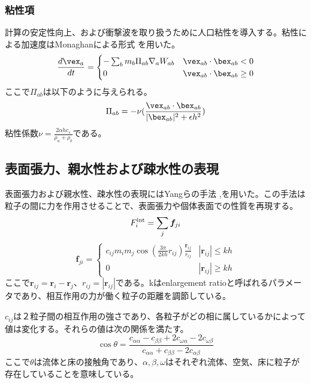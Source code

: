 \documentclass[]{jsarticle}
\begin{document}
\subsubsection{粘性項}
計算の安定性向上、および衝撃波を取り扱うために人口粘性を導入する。粘性による加速度はMonaghanによる形式 \cite{Monaghan2005}を用いた。
\begin{equation}
\frac{d\vex_a}{dt}=\begin{cases}
  -\sum_bm_b\Pi_{ab}\nabla_aW_{ab} & \vex_{ab}\cdot\bex_{ab}<0 \\
  0 & \vex_{ab}\cdot\bex_{ab}\geq0
\end{cases}
\end{equation}
ここで$\Pi_{ab}$は以下のように与えられる。
\begin{equation}
\Pi_{ab}=-\nu(\frac{\vex_{ab}\cdot\bex_{ab}}{|\bex_{ab}|^2+\epsilon h^2})
\end{equation}
粘性係数$\nu=\frac{2\alpha h c_s}{\rho_a+\rho_b}$である。

\subsection{表面張力、親水性および疎水性の表現}
表面張力および親水性、疎水性の表現にはYangらの手法 \cite{Yang2016},\cite{Yang2017}を用いた。この手法は粒子の間に力を作用させることで、表面張力や個体表面での性質を再現する。
\begin{equation}
F^{\rm{int}}_i=\sum_{j} \bm{f}_{ji}
\end{equation}
\begin{equation}
  \bm{f}_{ji}=\begin{cases}
    c_{ij}m_im_j\cos(\frac{3\pi}{2kh}r_{ij})\frac{\bm{r}_{ij}}{r_{ij}} & \text{$|\bm{r}_{ij}|\leq kh$}\\
    0 & \text{$|\bm{r}_{ij}|\geq kh$}
\end{cases}
\end{equation}
ここで$\bm{r}_{ij}=\bm{r}_i-\bm{r}_{j}$、$r_{ij}=|\bm{r}_{ij}|$である。kはenlargement ratioと呼ばれるパラメータであり、相互作用の力が働く粒子の距離を調節している。

$c_{ij}$は２粒子間の相互作用の強さであり、各粒子がどの相に属しているかによって値は変化する。それらの値は次の関係を満たす。
\begin{equation}
\cos\theta=\frac{c_{\alpha\alpha}-c_{\beta\beta}+2c_{\omega\alpha}-2c_{\omega\beta}}{c_{\alpha\alpha} +c_{\beta\beta} -2c_{\alpha\beta}}
\end{equation}
ここで$\theta$は流体と床の接触角であり、$\alpha,\beta,\omega$はそれぞれ流体、空気、床に粒子が存在していることを意味している。
\end{document}
